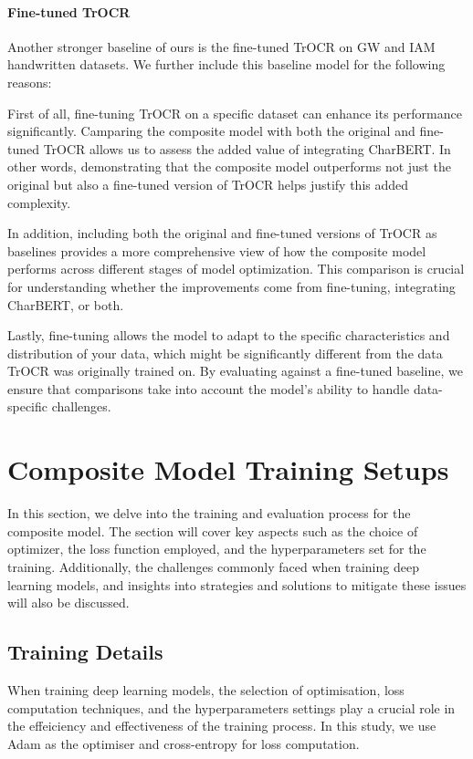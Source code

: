 \paragraph*{Fine-tuned TrOCR}
\label{par:4_fine_tuned_trocr}
Another stronger baseline of ours is the fine-tuned TrOCR on GW and IAM handwritten datasets. We further include this baseline model for the following reasons: 

First of all, fine-tuning TrOCR on a specific dataset can enhance its performance significantly. Camparing the composite model with both the original and fine-tuned TrOCR allows us to assess the added value of integrating CharBERT. In other words, demonstrating that the composite model outperforms not just the original but also a fine-tuned version of TrOCR helps justify this added complexity. 

In addition, including both the original and fine-tuned versions of TrOCR as baselines provides a more comprehensive view of how the composite model performs across different stages of model optimization. This comparison is crucial for understanding whether the improvements come from fine-tuning, integrating CharBERT, or both. 

Lastly, fine-tuning allows the model to adapt to the specific characteristics and distribution of your data, which might be significantly different from the data TrOCR was originally trained on. By evaluating against a fine-tuned baseline, we ensure that comparisons take into account the model's ability to handle data-specific challenges.
\section{Composite Model Training Setups}
\label{sec:4_model_training_process}
In this section, we delve into the training and evaluation process for the composite model. The section will cover key aspects such as the choice of optimizer, the loss function employed, and the hyperparameters set for the training. Additionally, the challenges commonly faced when training deep learning models, and insights into strategies and solutions to mitigate these issues will also be discussed.
\subsection{Training Details}
\label{subsec:4_training_details}
When training deep learning models, the selection of optimisation, loss computation techniques, and the hyperparameters settings play a crucial role in the effeiciency and effectiveness of the training process. In this study, we use Adam as the optimiser and cross-entropy for loss computation.

